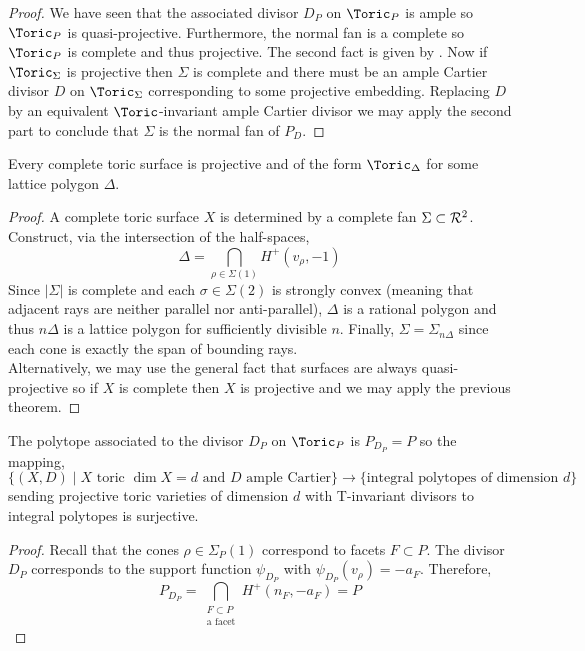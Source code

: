 \begin{proof}
We have seen that the associated divisor $D_P$ on $\Toric_P$ is ample so $\Toric_P$ is quasi-projective. Furthermore, the normal fan is a complete so $\Toric_P$ is complete and thus projective. The second fact is given by \cite[Thm. 7.2.3]{cox}. Now if $\Toric_\Sigma$ is projective then $\Sigma$ is complete and there must be an ample Cartier divisor $D$ on $\Toric_\Sigma$ corresponding to some projective embedding. Replacing $D$ by an equivalent $\Toric$-invariant ample Cartier divisor we may apply the second part to conclude that $\Sigma$ is the normal fan of $P_D$. 
\end{proof}

\begin{prop} \label{toric_surfaces_projective}
Every complete toric surface is projective and of the form $\Toric_{\Delta}$ for some lattice polygon $\Delta$. 
\end{prop}

\begin{proof}
A complete toric surface $X$ is determined by a complete fan $\Sigma \subset \mathcal{R}^2$. Construct, via the intersection of the half-spaces,
\[ \Delta = \bigcap_{\rho \in \Sigma(1)} H^+(v_\rho, -1) \]
Since $|\Sigma|$ is complete and each $\sigma \in \Sigma(2)$ is strongly convex (meaning that adjacent rays are neither parallel nor anti-parallel), $\Delta$ is a rational polygon and thus $n \Delta$ is a lattice polygon for sufficiently divisible $n$. Finally, $\Sigma = \Sigma_{n \Delta}$ since each cone is exactly the span of bounding rays.
\bigskip\\
Alternatively, we may use the general fact that surfaces are always quasi-projective \cite[\href{https://stacks.math.columbia.edu/tag/0C5N}{Tag 0C5N}]{stacks-project} so if $X$ is complete then $X$ is projective and we may apply the previous theorem. 
\end{proof}

\begin{theorem}
The polytope associated to the divisor $D_P$ on $\Toric_P$ is $P_{D_P} = P$ so the mapping,
\[ \{ (X, D) \mid X \text{ toric } \dim{X} = d \text{ and  } D \text{ ample Cartier} \} \to \{ \text{integral polytopes of dimension } d \} \]
sending projective toric varieties of dimension $d$ with T-invariant divisors to integral polytopes is surjective. 
\end{theorem}

\begin{proof}
Recall that the cones $\rho \in \Sigma_P(1)$ correspond to facets $F \subset P$. 
The divisor $D_P$ corresponds to the support function $\psi_{D_P}$ with $\psi_{D_P}(v_\rho) = - a_F$. Therefore,
\[ P_{D_P} = \bigcap_{\substack{F \subset P \\ \text{a facet}}} H^+(n_F, - a_F) = P \]
\end{proof}


